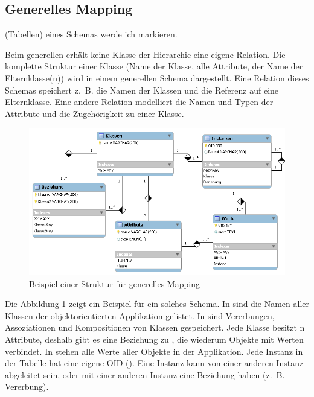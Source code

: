 \subsection{Generelles Mapping}
\begin{anmerkung}
 (Tabellen) eines Schemas werde ich  markieren.
\end{anmerkung}
\noindent Beim generellen  erhält keine Klasse der Hierarchie eine eigene Relation. Die komplette Struktur einer Klasse (Name der Klasse, alle Attribute, der Name der Elternklasse(n)) wird in einem generellen Schema dargestellt. Eine Relation dieses Schemas speichert z.~B. die Namen der Klassen und die Referenz auf eine Elternklasse. Eine andere Relation modelliert die Namen und Typen der Attribute und die Zugehörigkeit zu einer Klasse.\\
\begin{figure}[htbp]
  \includegraphics[width=\textwidth]{figures/generic_mapping_structure}
  \caption{Beispiel einer Struktur für generelles Mapping}
  \label{generic_mapping_structure}
\end{figure}
\noindent Die Abbildung \ref{generic_mapping_structure} zeigt ein Beispiel für ein solches Schema. In  sind die Namen aller Klassen der objektorientierten Applikation gelistet. In  sind Vererbungen, Assoziationen und Kompositionen von Klassen gespeichert. Jede Klasse besitzt n Attribute, deshalb gibt es eine Beziehung zu , die wiederum Objekte mit Werten verbindet. In  stehen alle Werte aller Objekte in der Applikation. Jede Instanz in der Tabelle  hat eine eigene OID (). Eine Instanz kann von einer anderen Instanz abgeleitet sein, oder mit einer anderen Instanz eine Beziehung haben (z.~B. Vererbung).

